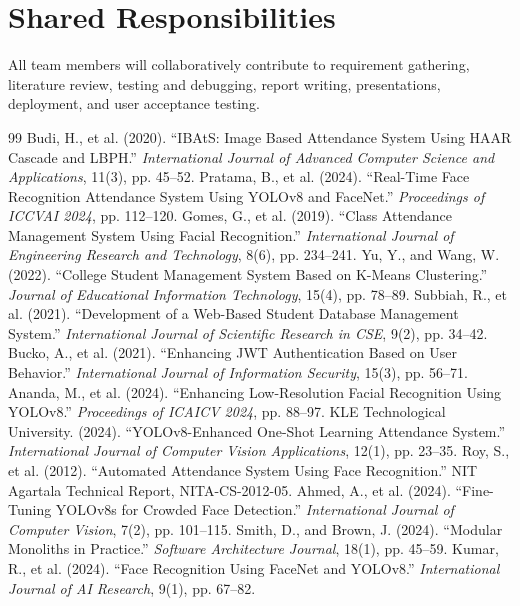 \documentclass[12pt,a4paper,oneside]{report}
\let\oldsection\section
\renewcommand{\section}{\clearpage\oldsection}
\begin{document}
\section{Shared Responsibilities}
All team members will collaboratively contribute to requirement gathering, literature review, testing and debugging, report writing, presentations, deployment, and user acceptance testing.

\begin{thebibliography}{99}
 Budi, H., et al. (2020). ``IBAtS: Image Based Attendance System Using HAAR Cascade and LBPH.'' \textit{International Journal of Advanced Computer Science and Applications}, 11(3), pp. 45--52.
 Pratama, B., et al. (2024). ``Real-Time Face Recognition Attendance System Using YOLOv8 and FaceNet.'' \textit{Proceedings of ICCVAI 2024}, pp. 112--120.
 Gomes, G., et al. (2019). ``Class Attendance Management System Using Facial Recognition.'' \textit{International Journal of Engineering Research and Technology}, 8(6), pp. 234--241.
 Yu, Y., and Wang, W. (2022). ``College Student Management System Based on K-Means Clustering.'' \textit{Journal of Educational Information Technology}, 15(4), pp. 78--89.
 Subbiah, R., et al. (2021). ``Development of a Web-Based Student Database Management System.'' \textit{International Journal of Scientific Research in CSE}, 9(2), pp. 34--42.
 Bucko, A., et al. (2021). ``Enhancing JWT Authentication Based on User Behavior.'' \textit{International Journal of Information Security}, 15(3), pp. 56--71.
 Ananda, M., et al. (2024). ``Enhancing Low-Resolution Facial Recognition Using YOLOv8.'' \textit{Proceedings of ICAICV 2024}, pp. 88--97.
 KLE Technological University. (2024). ``YOLOv8-Enhanced One-Shot Learning Attendance System.'' \textit{International Journal of Computer Vision Applications}, 12(1), pp. 23--35.
 Roy, S., et al. (2012). ``Automated Attendance System Using Face Recognition.'' NIT Agartala Technical Report, NITA-CS-2012-05.
 Ahmed, A., et al. (2024). ``Fine-Tuning YOLOv8s for Crowded Face Detection.'' \textit{International Journal of Computer Vision}, 7(2), pp. 101--115.
 Smith, D., and Brown, J. (2024). ``Modular Monoliths in Practice.'' \textit{Software Architecture Journal}, 18(1), pp. 45--59.
 Kumar, R., et al. (2024). ``Face Recognition Using FaceNet and YOLOv8.'' \textit{International Journal of AI Research}, 9(1), pp. 67--82.

\end{thebibliography}
\end{document}
